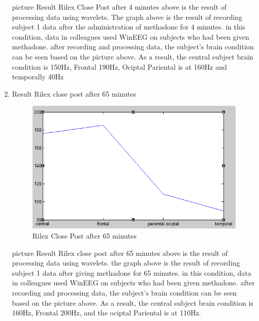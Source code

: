 \begin{enumerate}
\par
picture Result Rilex Close Post after 4 minutes above is the result of processing data using wavelets. The graph above is the result of recording subject 1 data after the administration of methadone for 4 minutes. in this condition, data in colleagues used WinEEG on subjects who had been given methadone. after recording and processing data, the subject's brain condition can be seen based on the picture above. As a result, the central subject brain condition is 150Hz, Frontal 190Hz, Ociptal Pariental is at 160Hz and temporally 40Hz
\item Result Rilex close post after 65 minutes
\begin{figure}[h!]
\centering
\includegraphics[scale=0.6]{figures/hasil3.PNG}
\caption{Rilex Close Post after 65 minutes}
\label{labelgambar13}
\end{figure}

\par
picture Result Rilex close post after 65 minutes above is the result of processing data using wavelets. the graph above is the result of recording subject 1 data after giving methadone for 65 minutes. in this condition, data in colleagues used WinEEG on subjects who had been given methadone. after recording and processing data, the subject's brain condition can be seen based on the picture above. As a result, the central subject brain condition is 160Hz, Frontal 200Hz, and the ociptal Pariental is at 110Hz.
   
\end{enumerate}

    